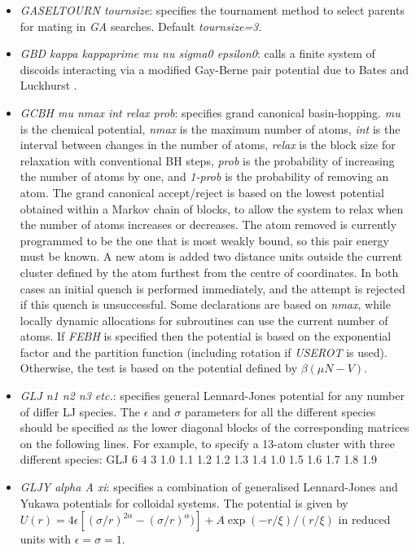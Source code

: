 \documentclass[12pt,a4paper,dvips]{article}
\begin{document}
\begin{itemize}
\item {\it GASELTOURN tournsize\/}: specifies the tournament method to select
parents for mating in {\it GA} searches. Default {\it tournsize=3\/}.

\item {\it GBD kappa kappaprime mu nu sigma0 epsilon0\/}: calls a finite system of discoids
interacting via a modified Gay-Berne pair potential due to Bates and Luckhurst \cite{BatesL96}.

\item {\it GCBH mu nmax int relax prob}: specifies grand canonical basin-hopping.
{\it mu} is the chemical potential, {\it nmax} is the maximum number of atoms, 
{\it int} is the interval between changes in the number of atoms,
{\it relax} is the block size for relaxation with conventional BH steps,
{\it prob} is the probability of increasing the number of atoms by one,
and {\it 1-prob} is the probability of removing an atom.
The grand canonical accept/reject is based on the lowest potential obtained within
a Markov chain of blocks, to allow the system to relax when the number of atoms
increases or decreases.
The atom removed is currently programmed to be the one that is most weakly bound, so
this pair energy must be known.
A new atom is added two distance units outside the current cluster defined
by the atom furthest from the centre of coordinates.
In both cases an initial quench is performed immediately, and the attempt is rejected
if this quench is unsuccessful.
Some declarations are based on {\it nmax}, while locally dynamic allocations 
for subroutines can use the current number of atoms.
If {\it FEBH} is specified then the potential is based on the exponential factor
and the partition function (including rotation if {\it USEROT} is used).
Otherwise, the test is based on the potential defined by $\beta(\mu N-V)$.

\item {\it GLJ n1 n2 n3 etc.}: specifies general Lennard-Jones potential for any number of
differ LJ species.
The $\epsilon$ and $\sigma$ parameters for all the different species should be specified as
the lower diagonal blocks of the corresponding matrices on the following lines.
For example, to specify a 13-atom cluster with three different species:
{\obeylines
GLJ 6 4 3
1.0
1.1 1.2 
1.2 1.3 1.4
1.0
1.5 1.6
1.7 1.8 1.9
}

\item {\it GLJY alpha A xi}: specifies a combination of generalised Lennard-Jones and Yukawa potentials for colloidal systems. 
The potential is given by $U(r) = 4\epsilon \left[ (\sigma/r)^{2\alpha} - (\sigma/r)^{\alpha}) \right] + A \exp(-r/\xi) / (r/\xi)$
in reduced units with $\epsilon = \sigma = 1$.


\end{itemize}
\end{document}
